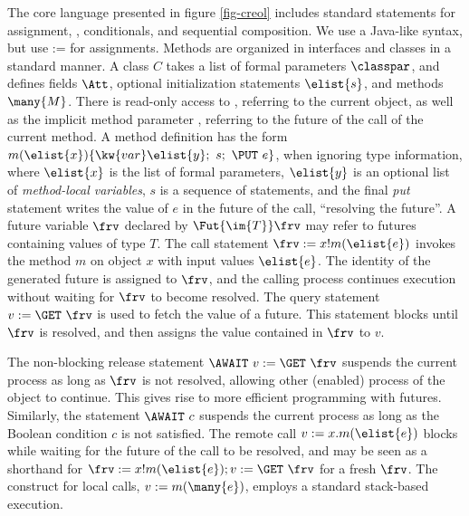 \documentclass[12pt]{article}%
\begin{document}
The core language presented in figure \ref{fig-creol}
includes standard
statements for assignment, , conditionals, and sequential
composition.  We use a Java-like syntax, but use := for assignments.
Methods are organized in interfaces and classes in a
standard manner.  A class $C$ takes a list of formal  parameters
$\classpar$, and defines fields $\Att$, optional initialization statements $\elist{s}$, and methods $\many{M}$.  
There is read-only access to 
 \this, referring to the current object, as well as %
the implicit method parameter \destiny, referring  to the future of the call
of the current method.
A method definition has the form $m (\elist{x})\{\kw{var }\elist{y};\
s;\ \PUT\ e\}$, when ignoring type information, where $\elist{x}$ is
the list of formal parameters, $\elist{y}$ is an optional list of
\emph{method-local variables}, $s$ is a sequence of statements, and
the final 
\emph{put} statement writes
the value of $e$ %
in the future of the call, ``resolving the future''.
%
A future variable $\frv$  declared by $\Fut{\im{T}} \frv$  may refer to
futures  containing values  of type
$T$. The call statement $\frv := x!m(\elist{e})$ invokes the method $m$ on
object $x$ with input values $\elist{e}$.  The identity of the
generated future is assigned to $\frv$, and the calling process
continues execution without waiting for $\frv$ to become resolved.  The
query statement $v :=  \GET\ \frv$ is used to fetch the value of a
future. This statement blocks until $\frv$ is resolved, and then 
assigns the value contained in $\frv$ to $v$. 

The non-blocking release statement $\AWAIT \ v := \GET\ \frv$ suspends
the current process as long as $\frv$ is not resolved,
allowing other (enabled) process of the object to continue.
This gives rise to more efficient programming with futures.
Similarly, the statement
$\AWAIT \ c$ %
suspends the current process as long as the Boolean condition $c$ is
not satisfied.
%
The remote call $v :=  x.m(\elist{e})$ blocks while waiting for
the future of the call to be resolved, and may be seen as a 
shorthand for  $\frv := x!m(\elist{e}); v :=  \GET\ \frv$ 
for a fresh $\frv$.
The construct for local calls, $v:=m(\many{e})$,
employs a standard stack-based execution.

\end{document}
